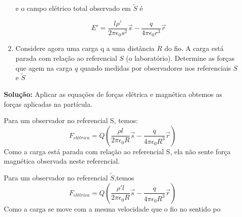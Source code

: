 \documentclass[10pt,a4paper]{article}
\begin{document}
\begin{enumerate}
\begin{enumerate}
		e o campo elétrico total observado em $\tilde{S}$ é
		
		\begin{equation*}
			E' = \dfrac{l\rho\prime }{2\pi \epsilon_0s^2 }\vec{s} - \dfrac{q}{4\pi \epsilon_0 r^3}\vec{r}
		\end{equation*}
		
		\item Considere agora uma carga q a uma distância $R$ do fio. A carga está parada com relação ao referencial $S$ (o laboratório). Determine as forças que agem na carga $q$ quando medidas por observadores nos referenciais $S$ e $\tilde{S}$
	\end{enumerate}
	\textbf{Solução: }
	Aplicar as equações de forças elétrica e magnética obtemos as forças aplicadas na partícula.
	
	Para um observador no referencial S, temos:
	\begin{equation*}
		F_{elétrica} =Q\left( \dfrac{\rho l}{2\pi \epsilon_0R }\vec{s}-\dfrac{q}{4\pi \epsilon_0 R^3}\vec{r}\right)
	\end{equation*}
	Como a carga está parada com relação ao referencial S, ela não sente força magnética observada neste referencial.
	
	Para um observador no referencial $\tilde{S}$,temos
	\begin{equation*}
		F_{elétrica} =Q\left( \dfrac{\rho\prime l}{2\pi \epsilon_0R }\vec{s}-\dfrac{q}{4\pi \epsilon_0 R^3}\vec{r}\right)
	\end{equation*}
	Como a carga se move com a mesma velocidade que o fio no sentido po
	
	
\end{enumerate}
\end{document}
